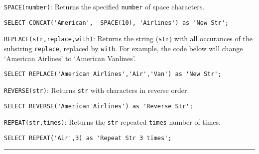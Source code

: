 \documentclass{article}
\begin{document}
\begin{outline}
    
    
    
    
    
    
   
      
   \1 \texttt{SPACE(number)}: Returns the specified \texttt{number} of space characters.
   
       
\begin{lstlisting}[frame=single]  
SELECT CONCAT('American',  SPACE(10), 'Airlines') as 'New Str';
\end{lstlisting}

    
    
    
    
   
      
   \1 \texttt{REPLACE(str,replace,with)}: Returns the string (\texttt{str}) with all occurances of the substring \texttt{replace}, replaced by \texttt{with}.  For example, the code below will change `American Airlines' to `American Vanlines'.   
       
\begin{lstlisting}[frame=single]  
SELECT REPLACE('American Airlines','Air','Van') as 'New Str';
\end{lstlisting}

    
    
   
      
   \1 \texttt{REVERSE(str)}: Returns  \texttt{str} with characters in reverse order. 

       
\begin{lstlisting}[frame=single]  
SELECT REVERSE('American Airlines') as 'Reverse Str';
\end{lstlisting}

    
    
    
    
    
   
      
   \1 \texttt{REPEAT(str,times)}: Returns the \texttt{str}
repeated  \texttt{times} number of times.  
       
\begin{lstlisting}[frame=single]  
SELECT REPEAT('Air',3) as 'Repeat Str 3 times';
\end{lstlisting}


\end{outline}
  

\hspace{-0.5cm}\rule[-0.101in]{\textwidth}{0.0025in}
    
\end{document}
